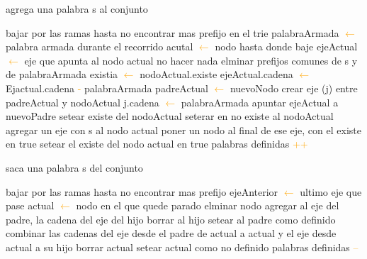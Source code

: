 \begin{algorithm}
\caption{agrega una palabra s al conjunto}
\begin{algorithmic}[1]
\STATE bajar por las ramas hasta no encontrar mas prefijo en el trie
\STATE palabraArmada \textcolor{orange}{$\leftarrow$} palabra armada durante el recorrido
\STATE acutal \textcolor{orange}{$\leftarrow$} nodo hasta donde baje
\STATE ejeActual \textcolor{orange}{$\leftarrow$} eje que apunta al nodo actual
	\STATE no hacer nada
\ELSE
	\STATE elminar prefijos comunes de s y de palabraArmada
		\STATE {} 
		\STATE existia \textcolor{orange}{$\leftarrow$} nodoActual.existe
		\STATE ejeActual.cadena \textcolor{orange}{$\leftarrow$} Ejactual.cadena \textcolor{orange}{-} palabraArmada  
		\STATE padreActual \textcolor{orange}{$\leftarrow$} nuevoNodo 
		\STATE crear eje (j) entre padreActual y nodoActual
		\STATE j.cadena \textcolor{orange}{$\leftarrow$} palabraArmada
		\STATE apuntar ejeActual a nuevoPadre 
			\STATE setear existe del nodoActual
		\ELSE
			\STATE seterar en no existe al nodoActual
		\ENDIF
\ENDIF
\ENDIF
		\STATE agregar un eje con s al nodo actual
		\STATE poner un nodo al final de ese eje, con el existe en true
	\ELSE
		\STATE setear el existe del nodo actual en true
	\ENDIF
\STATE palabras definidas \textcolor{orange}{++}
\end{algorithmic}
\end{algorithm}

\begin{algorithm}
\caption{saca una palabra s del conjunto}
\begin{algorithmic}[1]
\STATE bajar por las ramas hasta no encontrar mas prefijo
\STATE ejeAnterior \textcolor{orange}{$\leftarrow$} ultimo eje que pase
\STATE actual \textcolor{orange}{$\leftarrow$} nodo en el que quede parado
		\STATE elminar nodo
		 \STATE {}
		\STATE agregar al eje del padre, la cadena del eje del hijo
		\STATE borrar al hijo
		\STATE setear al padre como definido
		\ENDIF
	\ELSE
		\STATE {}
		\STATE combinar las cadenas del eje desde el padre de actual a actual y el eje desde actual a su hijo 
		\STATE borrar actual
		\ELSE
				\STATE {}
				\STATE setear actual como no definido
		\ENDIF
	\ENDIF
	palabras definidas \textcolor{orange}{--}
\ENDIF
\end{algorithmic}
\end{algorithm}		

